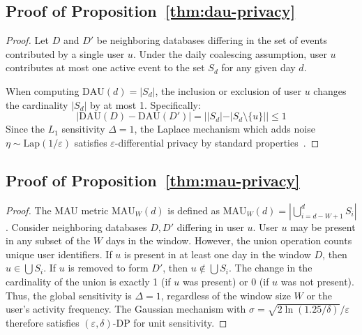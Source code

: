 \documentclass[sigconf,anonymous,review]{acmart}
\begin{document}
\subsection{Proof of Proposition~\ref{thm:dau-privacy}}
\begin{proof}
    Let $D$ and $D'$ be neighboring databases differing in the set of events contributed by a single user $u$. Under the daily coalescing assumption, user $u$ contributes at most one active event to the set $S_d$ for any given day $d$.

    When computing $\text{DAU}(d) = |S_d|$, the inclusion or exclusion of user $u$ changes the cardinality $|S_d|$ by at most 1. Specifically:
    \[
        |\text{DAU}(D) - \text{DAU}(D')| = ||S_d| - |S_d \setminus \{u\}|| \le 1
    \]
    Since the $L_1$ sensitivity $\Delta = 1$, the Laplace mechanism which adds noise $\eta \sim \text{Lap}(1/\varepsilon)$ satisfies $\varepsilon$-differential privacy by standard properties~\cite{Dwork2006}.
\end{proof}

\subsection{Proof of Proposition~\ref{thm:mau-privacy}}
\begin{proof}
    The MAU metric $\text{MAU}_W(d)$ is defined as $\text{MAU}_W(d) = |\bigcup_{i=d-W+1}^{d} S_i|$.
    Consider neighboring databases $D, D'$ differing in user $u$. User $u$ may be present in any subset of the $W$ days in the window. However, the union operation counts unique user identifiers.
    If $u$ is present in at least one day in the window $D$, then $u \in \bigcup S_i$. If $u$ is removed to form $D'$, then $u \notin \bigcup S_i$.
    The change in the cardinality of the union is exactly 1 (if $u$ was present) or 0 (if $u$ was not present).
    Thus, the global sensitivity is $\Delta = 1$, regardless of the window size $W$ or the user's activity frequency.
    The Gaussian mechanism with $\sigma = \sqrt{2\ln(1.25/\delta)}/\varepsilon$ therefore satisfies $(\varepsilon, \delta)$-DP for unit sensitivity.
\end{proof}
\end{document}
